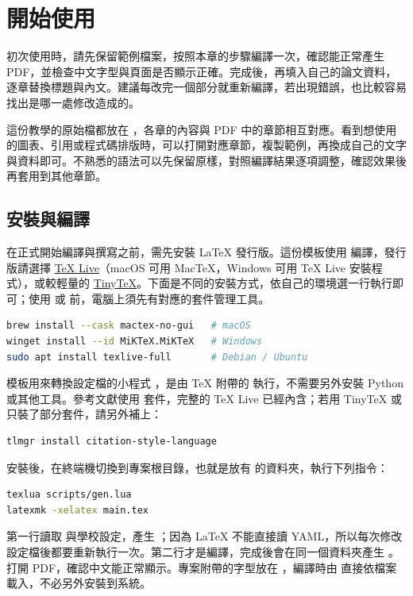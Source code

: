 \chapter{開始使用}\label{cha:start}

初次使用時，請先保留範例檔案，按照本章的步驟編譯一次，確認能正常產生 PDF，並檢查中文字型與頁面是否顯示正確。完成後，再填入自己的論文資料，逐章替換標題與內文。建議每改完一個部分就重新編譯，若出現錯誤，也比較容易找出是哪一處修改造成的。

這份教學的原始檔都放在 ，各章的內容與 PDF 中的章節相互對應。看到想使用的圖表、引用或程式碼排版時，可以打開對應章節，複製範例，再換成自己的文字與資料即可。不熟悉的語法可以先保留原樣，對照編譯結果逐項調整，確認效果後再套用到其他章節。

\section{安裝與編譯}

在正式開始編譯與撰寫之前，需先安裝 \LaTeX{} 發行版。這份模板使用 \XeLaTeX{} 編譯，發行版請選擇 \href{https://www.tug.org/texlive/}{TeX Live}（macOS 可用 MacTeX，Windows 可用 TeX Live 安裝程式），或較輕量的 \href{https://yihui.org/tinytex/}{TinyTeX}。下面是不同的安裝方式，依自己的環境選一行執行即可；使用  或  前，電腦上須先有對應的套件管理工具。

\begin{lstlisting}[language=bash]
brew install --cask mactex-no-gui   # macOS
winget install --id MiKTeX.MiKTeX   # Windows
sudo apt install texlive-full       # Debian / Ubuntu
\end{lstlisting}

模板用來轉換設定檔的小程式 ，是由 \TeX{} 附帶的  執行，不需要另外安裝 Python 或其他工具。參考文獻使用  套件，完整的 \TeX{} Live 已經內含；若用 TinyTeX 或只裝了部分套件，請另外補上：

\begin{lstlisting}[language=bash]
tlmgr install citation-style-language
\end{lstlisting}

安裝後，在終端機切換到專案根目錄，也就是放有  的資料夾，執行下列指令：

\begin{lstlisting}[language=bash]
texlua scripts/gen.lua
latexmk -xelatex main.tex
\end{lstlisting}

第一行讀取  與學校設定，產生 ；因為 \LaTeX{} 不能直接讀 YAML，所以每次修改設定檔後都要重新執行一次。第二行才是編譯，完成後會在同一個資料夾產生 。打開 PDF，確認中文能正常顯示。專案附帶的字型放在 ，編譯時由  直接依檔案載入，不必另外安裝到系統。

